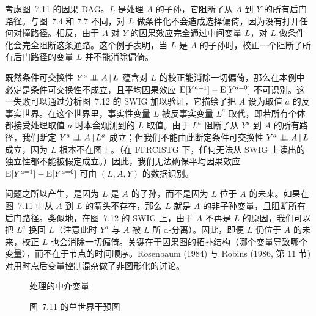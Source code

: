 \begin{finepoint}
考虑图~7.11 的因果 DAG。$L$ 是处理 $A$ 的子孙，它阻断了从 $A$ 到 $Y$ 的所有后门路径。与图~7.4 和 7.7 不同，对 $L$ 做条件化不会造成选择偏倚，因为没有打开任何对撞路径。相反，由于 $A$ 对 $Y$ 的因果效应完全通过中间变量 $L$，对 $L$ 做条件化会完全阻断这条通路。这个例子表明，当 $L$ 是 $A$ 的子孙时，校正一个阻断了所有后门路径的变量 $L$ 并不能消除偏倚。

既然条件可交换性 $Y^{a}\perp\!\!\!\perp A\,|\, L$ 蕴含对 $L$ 的校正能消除一切偏倚，那么在本例中必定是条件可交换性不成立，且平均因果效应 $\mathrm{E}[Y^{a=1}]-\mathrm{E}[Y^{a=0}]$ 不可识别。这一失败可以通过分析图~7.12 的 SWIG 加以验证，它描绘了把 $A$ 设为取值 $a$ 的反事实世界。在这个世界里，事实性变量 $L$ 被反事实变量 $L^{a}$ 取代，即若所有个体都接受处理取值 $a$ 时本会观测到的 $L$ 取值。由于 $L^{a}$ 阻断了从 $Y^{a}$ 到 $A$ 的所有路径，我们断定 $Y^{a}\perp\!\!\!\perp A\,|\, L^{a}$ 成立；但我们不能由此断定条件可交换性 $Y^{a}\perp\!\!\!\perp A\,|\, L$ 成立，因为 $L$ 根本不在图上。（在 FFRCISTG 下，任何无法从 SWIG 上读出的独立性都不能被假定成立。）因此，我们无法确保平均因果效应 $\mathrm{E}[Y^{a=1}]-\mathrm{E}[Y^{a=0}]$ 可由 $(L,A,Y)$ 的数据识别。

问题之所以产生，是因为 $L$ 是 $A$ 的子孙，而不是因为 $L$ 位于 $A$ 的未来。如果在图~7.11 中从 $A$ 到 $L$ 的箭头不存在，那么 $L$ 就是 $A$ 的非子孙变量，且阻断所有后门路径。类似地，在图~7.12 的 SWIG 上，由于 $A$ 不再是 $L$ 的原因，我们可以把 $L^{a}$ 换回 $L$（注意此时 $Y^{a}$ 与 $A$ 被 $L$ 所 d-分离）。因此，即便 $L$ 仍位于 $A$ 的未来，校正 $L$ 也会消除一切偏倚。关键在于因果图的拓扑结构（哪个变量导致哪个变量），而不在于节点的时间顺序。Rosenbaum (1984) 与 Robins (1986, 第 11 节) 对用时点后变量控制混杂做了非图形化的讨论。
\end{finepoint}

\begin{figure}[htbp]
\centering
{}
\caption{处理的中介变量}
\label{fig:7.11}
\end{figure}

\begin{figure}[htbp]
\centering
{}
\caption{图~7.11 的单世界干预图}
\label{fig:7.12}
\end{figure}

